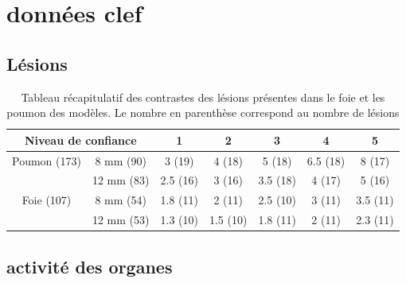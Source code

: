 	\section{données clef} %

\subsection{Lésions}

\begin{table}
\centering
 \begin{tabular}{|c|c||c|c|c|c|c|} 
\hline
\multicolumn{2}{|c|}{Niveau de confiance}       & 1	  & 2	    & 3	     & 4	& 5	\\
\hline
\hline
Poumon	(173)	& 8 mm (90)	& 3 (19)  & 4 (18)  & 5 (18)  & 6.5 (18)	& 8 (17)\\
\cline{2-7}
		& 12 mm	(83)	& 2.5 (16)& 3 (16)  & 3.5 (18)& 4 (17)	& 5 (16)\\
\hline
Foie 	(107)	& 8 mm (54)		& 1.8 (11)& 2 (11)  & 2.5 (10)& 3 (11)	& 3.5 (11)\\
\cline{2-7}
		& 12 mm	(53)	& 1.3 (10)& 1.5 (10)& 1.8 (11)& 2 (11)  & 2.3 (11)\\
\hline 
 \end{tabular}

\caption[Tableau récapitulatif des lésions]{Tableau récapitulatif des contrastes des lésions présentes dans le foie et les poumon des modèles. Le nombre en parenthèse correspond au nombre de lésions}
\label{tab:contrastePoumonFoieRecap}


\end{table}

\subsection{activité des organes}


